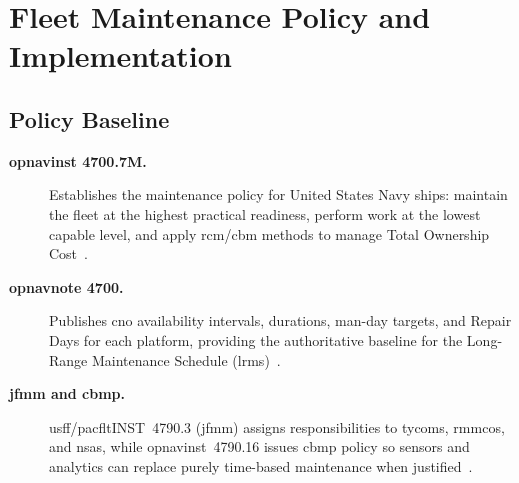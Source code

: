 \documentclass[../main.tex]{subfiles}
\begin{document}
\section{Fleet Maintenance Policy and Implementation}

\subsection{Policy Baseline}
\begin{description}
  \item[\textbf{\ac{opnavinst} 4700.7M.}] Establishes the maintenance policy for United States Navy ships: maintain the fleet at the highest practical readiness, perform work at the lowest capable level, and apply \ac{rcm}/\ac{cbm} methods to manage Total Ownership Cost~\autocite{OPNAVINST4700-7M}.
\item[\textbf{\ac{opnavnote} 4700.}] Publishes \ac{cno} availability intervals, durations, man-day targets, and Repair Days for each platform, providing the authoritative baseline for the Long-Range Maintenance Schedule (\ac{lrms})~\autocite{OPNAVNOTE4700-24}.
\item[\textbf{\ac{jfmm} and \ac{cbmp}.}] \ac{usff}/\ac{pacflt}INST~4790.3 (\ac{jfmm}) assigns responsibilities to \ac{tycom}s, \ac{rmmco}s, and \ac{nsa}s, while \ac{opnavinst}~4790.16 issues \ac{cbmp} policy so sensors and analytics can replace purely time-based maintenance when justified~\autocite{COMFLTFORCOMINST4790-3,OPNAVINST4790-16G}.
\end{description}
\end{document}
